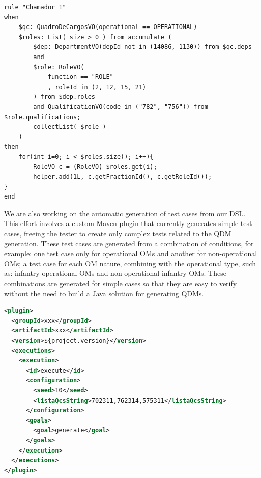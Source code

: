 \begin{lstlisting}[frame=single, language=DRL, caption={\it DRL generated}, label={code:drl}, basicstyle=\scriptsize]
rule "Chamador 1"   	
when
	$qc: QuadroDeCargosVO(operational == OPERATIONAL)	
	$roles: List( size > 0 ) from accumulate ( 
		$dep: DepartmentVO(depId not in (14086, 1130)) from $qc.deps				  		   
		and
		$role: RoleVO(
			function == "ROLE"
			, roleId in (2, 12, 15, 21)  
		) from $dep.roles 		
		and QualificationVO(code in ("782", "756")) from $role.qualifications;				
		collectList( $role )
	) 		
then		 
	for(int i=0; i < $roles.size(); i++){       	
		RoleVO c = (RoleVO) $roles.get(i);
		helper.add(1L, c.getFractionId(), c.getRoleId());   
}               
end	\end{lstlisting}


We are also working on the automatic generation of test cases 
from our DSL. This effort involves a custom Maven plugin that currently generates simple test cases, 
freeing the tester to create only complex tests related to the QDM generation. 
These test cases are generated from a combination of conditions, for example: one test case only for operational OMs 
and another for non-operational OMs; a test case for each OM nature, combining with the operational type, 
such as: infantry operational OMs and non-operational infantry OMs. These combinations are generated for simple 
cases so that they are easy to verify without the need to build a Java solution for generating QDMs. 


\begin{lstlisting}[frame=single, language=XML, caption={\it Maven plugin for test generation}, label={code:plugin},basicstyle=\scriptsize]
<plugin>
  <groupId>xxx</groupId>
  <artifactId>xxx</artifactId>
  <version>${project.version}</version>
  <executions>
    <execution>
      <id>execute</id>			
      <configuration>
        <seed>10</seed>				
        <listaQcsString>702311,762314,575311</listaQcsString>				
      </configuration>
      <goals>
        <goal>generate</goal>
      </goals>
    </execution>
  </executions>
</plugin>	
\end{lstlisting}



